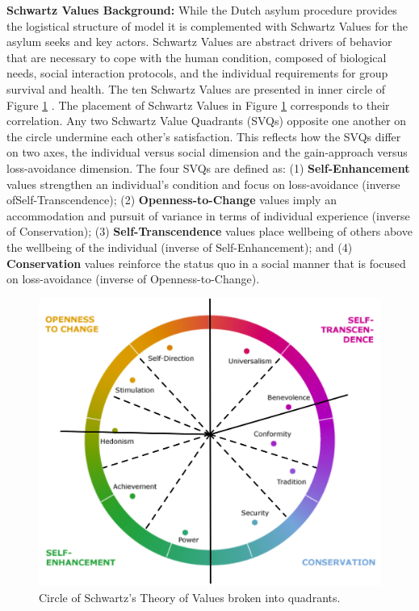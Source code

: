 \documentclass{scspaperproc}
\theoremstyle{scsthe}
\begin{document}
{\bf Schwartz Values Background:} While the Dutch asylum procedure provides the logistical structure of model it is complemented with Schwartz Values for the asylum seeks and key actors. Schwartz Values are abstract drivers of behavior that are necessary to cope with the human condition, composed of biological needs, social interaction protocols, and the individual requirements for group survival and health. The ten Schwartz Values are presented in inner circle of Figure \ref{fig:val-circle} \cite{76}. The placement of Schwartz Values in Figure \ref{fig:val-circle} corresponds to their correlation. Any two Schwartz Value Quadrants (SVQs) opposite one another on the circle undermine each other's satisfaction. This reflects how the SVQs differ on two axes, the individual versus social dimension and the gain-approach versus loss-avoidance dimension. The four SVQs are defined as: (1) {\bf Self-Enhancement} values strengthen an individual's condition and focus on loss-avoidance (inverse ofSelf-Transcendence); (2)  {\bf Openness-to-Change} values imply an accommodation and pursuit of variance in terms of individual experience (inverse of Conservation); (3) {\bf Self-Transcendence} values place wellbeing of others above the wellbeing of the individual (inverse of Self-Enhancement); and (4) {\bf Conservation} values reinforce the status quo in a social manner that is focused on loss-avoidance (inverse of Openness-to-Change).

\begin{figure}[htb]
{
\centering
\includegraphics[width=0.45\columnwidth]{Color-Value-Circle.png}
\caption{Circle of Schwartz's Theory of Values broken into quadrants.}
\label{fig:val-circle}
}
\end{figure}
\end{document}

